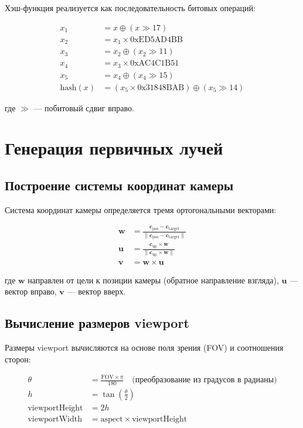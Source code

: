 \documentclass[14pt, a4paper]{extarticle}
\begin{document}
Хэш-функция реализуется как последовательность битовых операций:

\begin{align}
x_1 &= x \oplus (x \gg 17) \\
x_2 &= x_1 \times 0\text{xED5AD4BB} \\
x_3 &= x_2 \oplus (x_2 \gg 11) \\
x_4 &= x_3 \times 0\text{xAC4C1B51} \\
x_5 &= x_4 \oplus (x_4 \gg 15) \\
\text{hash}(x) &= (x_5 \times 0\text{x31848BAB}) \oplus (x_5 \gg 14)
\end{align}

где $\gg$ --- побитовый сдвиг вправо.

\section{Генерация первичных лучей}

\subsection{Построение системы координат камеры}

Система координат камеры определяется тремя ортогональными векторами:

\begin{align}
\mathbf{w} &= \frac{\mathbf{c}_{\text{pos}} - \mathbf{c}_{\text{target}}}{\|\mathbf{c}_{\text{pos}} - \mathbf{c}_{\text{target}}\|} \\
\mathbf{u} &= \frac{\mathbf{c}_{\text{up}} \times \mathbf{w}}{\|\mathbf{c}_{\text{up}} \times \mathbf{w}\|} \\
\mathbf{v} &= \mathbf{w} \times \mathbf{u}
\end{align}

где $\mathbf{w}$ направлен от цели к позиции камеры (обратное направление взгляда), $\mathbf{u}$ --- вектор вправо, $\mathbf{v}$ --- вектор вверх.

\subsection{Вычисление размеров viewport}

Размеры viewport вычисляются на основе поля зрения (FOV) и соотношения сторон:

\begin{align}
\theta &= \frac{\text{FOV} \times \pi}{180} \quad \text{(преобразование из градусов в радианы)} \\
h &= \tan\left(\frac{\theta}{2}\right) \\
\text{viewportHeight} &= 2h \\
\text{viewportWidth} &= \text{aspect} \times \text{viewportHeight}
\end{align}
\end{document}
